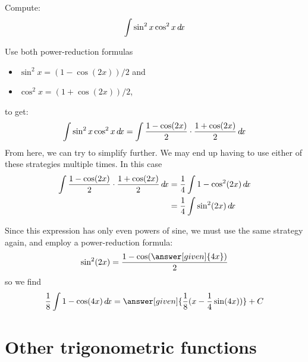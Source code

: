 \documentclass{ximera}
\begin{document}
\begin{example}
  Compute:
  \[
  \int \sin^2x\cos^2x\mathop{}\!d\! x
  \]
  \begin{explanation} 
    Use both power-reduction formulas
    \begin{itemize}
    \item $\sin^2x =(1-\cos(2x))/2$ and
    \item $\cos^2x =(1+\cos(2x))/2$,
    \end{itemize}
    to get:
    \[
    \int \sin^2x\cos^2x\mathop{}\!d\! x=\int \frac{1-\cos(2x)}{2}\cdot
    \frac{1+\cos(2x)}{2}\mathop{}\!d\! x
    \]
    From here, we can try to simplify further.  We may end up having
    to use either of these strategies multiple times.  In this case
    \begin{align*}
      \int \frac{1-\cos(2x)}{2} \cdot \frac{1+\cos(2x)}{2}\mathop{}\!d\! x &= \frac{1}{4} \int 1-\cos^2(2x) \mathop{}\!d\! x\\
      &= \frac{1}{4} \int \sin^2(2x) \mathop{}\!d\! x
    \end{align*}
    
    Since this expression has only even powers of sine, we must use
    the same strategy again, and employ a power-reduction formula:
    \[
    \sin^2(2x) = \frac{1-\cos(\answer[given]{4x})}{2}
    \]
    so we find
    \[
    \frac{1}{8}\int 1-\cos(4x) \d x = \answer[given]{\frac{1}{8}(x - \frac{1}{4}\sin(4x))} + C
    \]
  \end{explanation}
\end{example}


\section{Other trigonometric functions}
\end{document}
